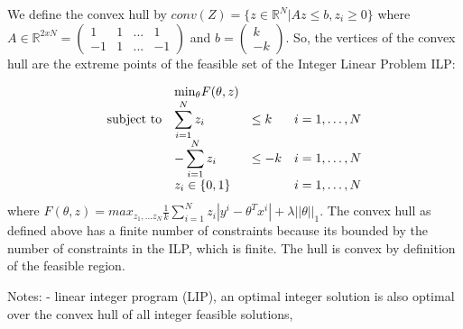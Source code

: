 \documentclass[10pt]{article}
\newenvironment{exercise}[2][Exercise]{\begin{trivlist}
  \item[\hskip \labelsep {\bfseries #1}\hskip \labelsep {\bfseries #2.}]}{\end{trivlist}}
\begin{document}
\begin{exercise}{6}
 We define the convex hull by $conv(Z)= \{ z \in\mathbb{R}^N | Az\leq b, z_i \geq 0 \}$ where $A \in\mathbb{R}^{2xN} = \begin{pmatrix}
1 & 1 & ... & 1\\
-1 & 1 & ... & -1
\end{pmatrix}$ and $ b = \begin{pmatrix}k\\-k
\end{pmatrix}$. So, the vertices of the convex hull are the extreme points of the feasible set of the Integer Linear Problem ILP:

\begin{equation}
\begin{array}{l@{}llll}
&&\text{min}_\theta F(\theta, z)\\
\text{subject to} 
&& \displaystyle\sum_{i=1}^{N}z_i &\leq k & i=1 ,\dots, N \\
&& -\displaystyle\sum_{i=1}^{N}z_i &\leq -k & i=1 ,\dots, N  \\
&& z_i \in \{0,1\} && i=1 ,\dots, N 
\end{array}
\end{equation}
where $F(\theta, z) = max_{z_1, ...z_N} \displaystyle\frac{1}{k} \sum_{i=1}^{N}z_i|y^i-\theta^Tx^i|+\lambda || \theta||_1$. 
The convex hull as defined above has a finite number of constraints because its bounded by the number of constraints in the ILP, which is finite. The hull is convex by definition of the feasible region. 


Notes:
- linear integer program (LIP), an optimal integer solution is also optimal over the
convex hull of all integer feasible solutions,

 \end{exercise}
 
\end{document}
